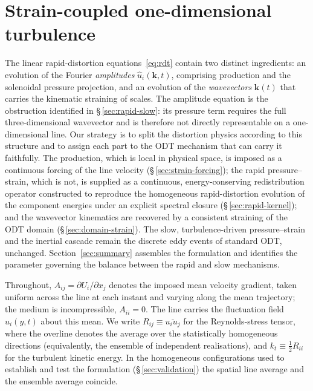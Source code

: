 \documentclass[lineno]{JFM-FLM_Au}
\begin{document}

\section{Strain-coupled one-dimensional turbulence}\label{sec:formulation}

The linear rapid-distortion equations~\eqref{eq:rdt} contain two distinct
ingredients: an evolution of the Fourier \emph{amplitudes}
$\hat{u}_i(\boldsymbol{k},t)$, comprising production and the solenoidal
pressure projection, and an evolution of the \emph{wavevectors}
$\boldsymbol{k}(t)$ that carries the kinematic straining of scales. The
amplitude equation is the obstruction identified in
\S\,\ref{sec:rapid-slow}: its pressure term requires the full
three-dimensional wavevector and is therefore not directly representable on
a one-dimensional line. Our strategy is to split the distortion physics
according to this structure and to assign each part to the ODT mechanism
that can carry it faithfully. The production, which is local in physical
space, is imposed as a continuous forcing of the line velocity
(\S\,\ref{sec:strain-forcing}); the rapid pressure--strain, which is not,
is supplied as a continuous, energy-conserving redistribution operator
constructed to reproduce the homogeneous rapid-distortion evolution of the
component energies under an explicit spectral closure
(\S\,\ref{sec:rapid-kernel}); and the wavevector kinematics are recovered by
a consistent straining of the ODT domain
(\S\,\ref{sec:domain-strain}). The slow, turbulence-driven
pressure--strain and the inertial cascade remain the discrete eddy events
of standard ODT, unchanged. Section~\ref{sec:summary} assembles the
formulation and identifies the parameter governing the balance between the
rapid and slow mechanisms.

Throughout, $A_{ij}=\partial U_i/\partial x_j$ denotes the imposed mean
velocity gradient, taken uniform across the line at each instant and
varying along the mean trajectory; the medium is incompressible,
$A_{ii}=0$. The line carries the fluctuation field $u_i(y,t)$ about this
mean. We write $R_{ij}\equiv\overline{u_i u_j}$ for the Reynolds-stress
tensor, where the overline denotes the average over the statistically
homogeneous directions (equivalently, the ensemble of independent
realisations), and $k_t\equiv\tfrac12 R_{ii}$ for the turbulent kinetic
energy. In the homogeneous configurations used to establish and test the
formulation (\S\,\ref{sec:validation}) the spatial line average and the
ensemble average coincide.
\end{document}
